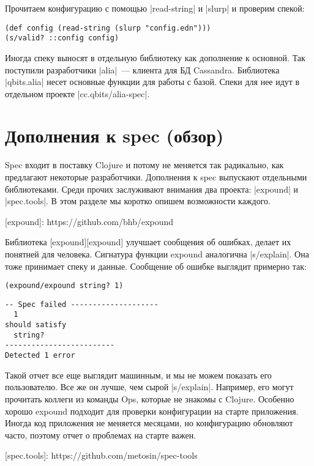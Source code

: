 Прочитаем конфигурацию с помощью \spverb|read-string| и \spverb|slurp| и
проверим спекой:

\begin{verbatim}
(def config (read-string (slurp "config.edn")))
(s/valid? ::config config)
\end{verbatim}

Иногда спеку выносят в отдельную библиотеку как дополнение к основной. Так
поступили разработчики \spverb|alia|~--- клиента для БД Cassandra. Библиотека
\spverb|qbits.alia| несет основные функции для работы с базой. Спеки для нее
идут в отдельном проекте \spverb|cc.qbits/alia-spec|.


\section{Дополнения к spec (обзор)}

Spec входит в поставку Clojure и потому не меняется так радикально, как
предлагают некоторые разработчики. Дополнения к spec выпускают отдельными
библиотеками. Среди прочих заслуживают внимания два проекта: \spverb|expound| и
\spverb|spec.tools|. В этом разделе мы коротко опишем возможности каждого.

[expound]: https://github.com/bhb/expound

Библиотека [expound][expound] улучшает сообщения об ошибках, делает их понятней
для человека. Сигнатура функции expound аналогична \spverb|s/explain|. Она тоже принимает
спеку и данные. Сообщение об ошибке выглядит примерно так:

\begin{verbatim}
(expound/expound string? 1)
\end{verbatim}

\begin{verbatim}
-- Spec failed --------------------
  1
should satisfy
  string?
-------------------------
Detected 1 error
\end{verbatim}

Такой отчет все еще выглядит машинным, и мы не можем показать его
пользователю. Все же он лучше, чем сырой \spverb|s/explain|. Например, его могут
прочитать коллеги из команды Ops, которые не знакомы с Clojure. Особенно хорошо
expound подходит для проверки конфигурации на старте приложения. Иногда код
приложения не меняется месяцами, но конфигурацию обновляют часто, поэтому отчет
о проблемах на старте важен.

[spec.tools]: https://github.com/metosin/spec-tools

